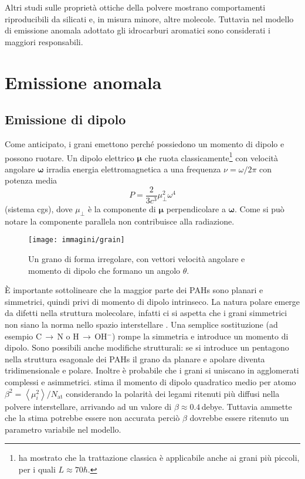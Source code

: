 Altri studi \parencite{Forrest} sulle proprietà ottiche della polvere mostrano comportamenti riproducibili da silicati e, in misura minore, altre molecole. Tuttavia nel modello di emissione anomala adottato gli idrocarburi aromatici sono considerati i maggiori responsabili.

\section{Emissione anomala}

\subsection{Emissione di dipolo}

Come anticipato, i grani emettono perché possiedono un momento di dipolo e possono ruotare. Un dipolo elettrico $\boldsymbol{\mu}$ che ruota classicamente\footnote{\textcite{DL98b} ha mostrato che la trattazione classica è applicabile anche ai grani più piccoli, per i quali $L\approx70\hbar$.} con velocità angolare $\boldsymbol{\omega}$ irradia energia elettromagnetica a una frequenza $\nu=\omega/2\pi$ con potenza media
\begin{equation}
\label{potenza}
P=\frac{2}{3c^{3}}\mu_{\perp}^{2}\omega^{4}
\end{equation}
(sistema cgs), dove $\mu_{\perp}$ è la componente di $\boldsymbol{\mu}$ perpendicolare a $\boldsymbol{\omega}$. Come si può notare la componente parallela non contribuisce alla radiazione.

\begin{figure}[h]
\centering
\texttt{[image: immagini/grain]}
\caption{Un grano di forma irregolare, con vettori velocità angolare e momento di dipolo che formano un angolo $\theta$.}
\label{fig:grain}
\end{figure}


È importante sottolineare che la maggior parte dei PAHs sono planari e simmetrici, quindi privi di momento di dipolo intrinseco. La natura polare emerge da difetti nella struttura molecolare, infatti ci si aspetta che i grani simmetrici non siano la norma nello spazio interstellare \parencite[p.160]{DL98b}. Una semplice sostituzione (ad esempio C\,$\rightarrow$\,N o H\,$\rightarrow$\,OH$^-$) rompe la simmetria e introduce un momento di dipolo. Sono possibili anche modifiche strutturali: se si introduce un pentagono nella struttura esagonale dei PAHs il grano da planare e apolare diventa tridimensionale e polare. Inoltre è probabile che i grani si uniscano in agglomerati complessi e asimmetrici. \textcite{DL98b} stima il momento di dipolo quadratico medio per atomo $\beta^{2}=\left< \mu_{i}^2 \right>/N_{\mathrm{at}}$ considerando la polarità dei legami ritenuti più diffusi nella polvere interstellare, arrivando ad un valore di $\beta\approx0.4$\,debye. Tuttavia ammette che la stima potrebbe essere non accurata perciò $\beta$ dovrebbe essere ritenuto un parametro variabile nel modello.

